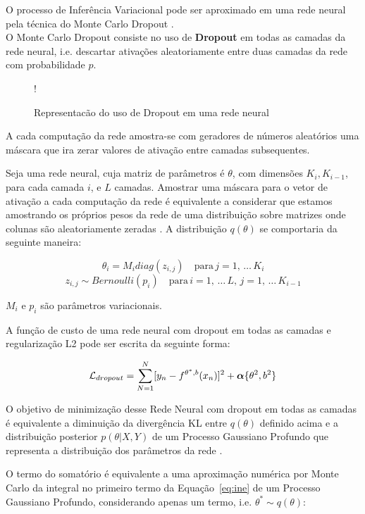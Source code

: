 O processo de Inferência Variacional pode ser aproximado em uma rede neural pela técnica do Monte Carlo Dropout \citep{dropbayes}. \\

O Monte Carlo Dropout consiste no uso de \textbf{Dropout} em todas as camadas da rede
neural, i.e. descartar ativações aleatoriamente entre duas camadas da rede com
probabilidade $p$.\\

\begin{figure}
  \centering
  \resizebox {\columnwidth} {!} {}
  \label{fig:dropout}
  \caption{Representacão do uso de Dropout em uma rede neural}
\end{figure}


A cada computação da rede amostra-se com geradores de números aleatórios uma
máscara que ira zerar valores de ativação entre camadas subsequentes.

Seja uma rede neural, cuja matriz de parâmetros é $\theta$, com dimensões
$K_i,K_{i-1}$, para cada camada $i$, e $L$ camadas.
Amostrar uma máscara para o vetor de ativação a cada computação da rede é equivalente a considerar que estamos
amostrando os próprios pesos da rede de uma distribuição sobre matrizes onde
colunas são aleatoriamente zeradas \citep{dropbayes}. A distribuição $q(\theta)$
se comportaria da seguinte maneira:

\newcommand{\diag}{\mathop{\mathrm{diag}}}

\[
  \theta_i   = M_i   diag (z_{i,j}) \quad \text{para} \, j=1, \, \dots  \,K_i
\] 
\[
  z_{i,j}  \sim Bernoulli(p_i) \quad  \text{para} \, i=1, \, \dots \, L, \, j=1, \, \dots \, K_{i-1}
\]   

$M_i$ e $p_i$ são parâmetros variacionais.

A função de custo de uma rede neural com dropout em todas as camadas  e
regularização L2 pode ser escrita da seguinte forma:

\[     \mathcal{L}_{dropout} = \sum^N_{N=1} [y_n - \mathnormal{f}^{\theta^*,b}(x_n)]^2 + \boldsymbol{\alpha}\{\theta^2,b^2\} \]


O objetivo de minimização desse Rede Neural com dropout em todas as camadas é
equivalente a diminuição da divergência KL entre $q(\theta)$ definido acima e a distribuição
posterior $p(\theta | X,Y)$ de um Processo Gaussiano Profundo que representa a
distribuição dos parâmetros da rede \citep{dropbayes}. 

O termo do somatório é equivalente a uma aproximação numérica por Monte Carlo da integral no
primeiro termo da Equação~\ref{eq:ine} de um Processo Gaussiano Profundo, considerando apenas um termo, i.e. $\theta^* \sim q(\theta)$:

